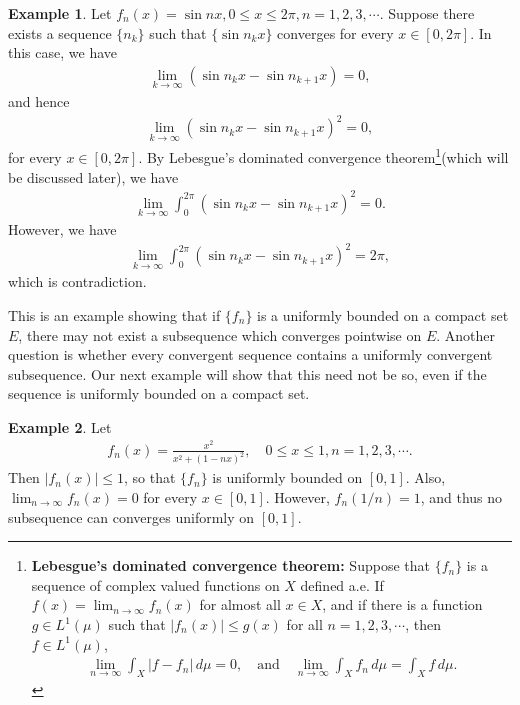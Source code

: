 \documentclass[11pt]{book}
\theoremstyle{definition}
\newtheorem{example}{Example}[chapter]
\numberwithin{equation}{chapter}
\begin{document}
\begin{example}
Let $f_n(x) = \sin nx, 0 \leq x \leq 2\pi, n = 1,2,3,\cdots$. Suppose there exists a sequence $\{n_k\}$ such that $\{\sin n_kx\}$ converges for every $x \in [0,2\pi]$. In this case, we have
\begin{align*}
    \lim_{k\to\infty} \left(\sin n_kx - \sin n_{k+1}x\right) = 0,
\end{align*}
and hence
\begin{align*}
    \lim_{k\to\infty} \left(\sin n_kx - \sin n_{k+1}x\right)^2 = 0,
\end{align*}
for every $x \in [0,2\pi]$. By Lebesgue's dominated convergence theorem\footnote{{\bf Lebesgue's dominated convergence theorem:} Suppose that $\{f_n\}$ is a sequence of complex valued functions on $X$ defined a.e. If $f(x) = \lim_{n\to\infty} f_n(x)$ for almost all $x \in X$, and if there is a function $g \in L^1(\mu)$ such that $\left|f_n(x)\right| \leq g(x)$ for all $n = 1,2,3,\cdots$, then $f \in L^1(\mu)$,
\begin{align*}
    \lim_{n\to\infty} \int_X \left|f - f_n\right|\,d\mu = 0,\quad \text{and} \quad \lim_{n\to\infty} \int_X f_n\,d\mu = \int_X f\,d\mu.
\end{align*}}(which will be discussed later), we have
\begin{align*}
    \lim_{k\to\infty} \int^{2\pi}_0 \left(\sin n_kx - \sin n_{k+1}x\right)^2 = 0.
\end{align*}
However, we have
\begin{align*}
    \lim_{k\to\infty} \int^{2\pi}_0 \left(\sin n_kx - \sin n_{k+1}x\right)^2 = 2\pi,
\end{align*}
which is contradiction.
\end{example}

\medskip

This is an example showing that if $\{f_n\}$ is a uniformly bounded on a compact set $E$, there may not exist a subsequence which converges pointwise on $E$. Another question is whether every convergent sequence contains a
uniformly convergent subsequence. Our next example will show that this need not be so, even if the sequence is uniformly bounded on a compact set.

\medskip

\begin{example}\label{ex_64}
Let
\begin{align*}
    f_n(x) = \frac{x^2}{x^2 + (1 - nx)^2}, \quad 0 \leq x \leq 1, n = 1,2,3,\cdots.
\end{align*}
Then $\left|f_n(x)\right| \leq 1$, so that $\{f_n\}$ is uniformly bounded on $[0,1]$. Also, $\lim_{n\to\infty} f_n(x) = 0$ for every $x \in [0,1]$. However, $f_n(1/n) = 1$, and thus no subsequence can converges uniformly on $[0,1]$.
\end{example}
\end{document}
